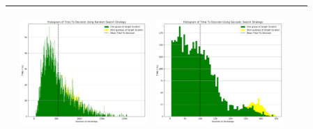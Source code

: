 \begin{landscape}
\begin{table}[h!]
\begin{tabular}{ | c | c | c | c | c |}
\begin{minipage}[c][48mm][c]{48mm}
    \end{minipage}
    &
    \begin{minipage}[c][48mm][c]{48mm}
      \includegraphics[width=48mm, height=48mm]{Chapters/MultiAgentTargetDetection/Figs/Histograms/VaryingInitBelief/75/75RandomHistogram.png}
    \end{minipage}
    &
    \begin{minipage}[c][48mm][c]{48mm}
      \includegraphics[width=48mm, height=48mm]{Chapters/MultiAgentTargetDetection/Figs/Histograms/VaryingInitBelief/75/75SaccadicHistogram.png}
    \end{minipage}
    \\
    \hline


\end{tabular}
\end{table}
\end{landscape}
